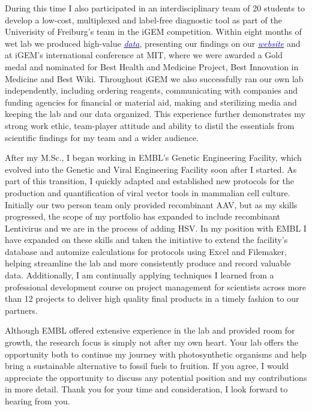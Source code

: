 \documentclass[11pt,a4paper,sans]{moderncv}
\begin{document}
\begin{spacing}{1.2}
During this time I also participated in an interdisciplinary team of 20 students to develop a low-cost, multiplexed and label-free diagnostic tool as part of the Univerisity of Freiburg's team in the iGEM competition.
Within eight months of wet lab we produced high-value {\href{https://www.ncbi.nlm.nih.gov/pubmed/29803867}{\textcolor{blue}{\textit{data}}}}, presenting our findings on our {\href{http://2015.igem.org/Team:Freiburg}{\textcolor{blue}{\textit{website}}}} and at iGEM's international conference at MIT, where we were awarded a Gold medal and nominated for Best Health and Medicine Project, Best Innovation in Medicine and Best Wiki.
Throughout iGEM we also successfully ran our own lab independently, including ordering reagents, communicating with companies and funding agencies for financial or material aid, making and sterilizing media and keeping the lab and our data organized. 
This experience further demonstrates my strong work ethic, team-player attitude and ability to distil the essentials from scientific findings for my team and a wider audience.\par\vspace*{3mm}

After my M.Sc., I began working in EMBL's Genetic Engineering Facility, which evolved into the Genetic and Viral Engineering Facility soon after I started. 
As part of this transition, I quickly adapted and established new protocols for the production and quantification of viral vector tools in mammalian cell culture. 			
Initially our two person team only provided recombinant AAV, but as my skills progressed, the scope of my portfolio has expanded to include recombinant Lentivirus and we are in the process of adding HSV.
In my position with EMBL I have expanded on these skills and taken the initiative to extend the facility's database and automize calculations for protocols using Excel and Filemaker, helping streamline the lab and more consistently produce and record valuable data.
Additionally, I am continually applying techniques I learned from a professional development course on project management for scientists across more than 12 projects to deliver high quality final products in a timely fashion to our partners.\par\vspace*{3mm}

Although EMBL offered extensive experience in the lab and provided room for growth, the research focus is simply not after my own heart.
Your lab offers the opportunity both to continue my journey with photosynthetic organisms and help bring a sustainable alternative to fossil fuels to fruition. 
If you agree, I would appreciate the opportunity to discuss any potential position and my contributions in more detail. 
Thank you for your time and consideration, I look forward to hearing from you.
 
\vspace{5mm}
\end{spacing}
\makeletterclosing
\end{document}
